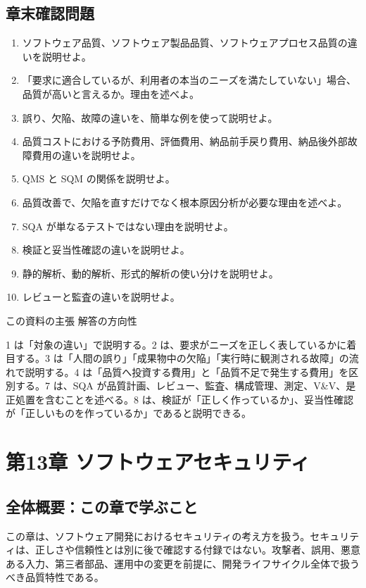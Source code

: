 \documentclass[a4paper,11pt]{ltjsarticle}
\numberwithin{figure}{section}
\numberwithin{table}{section}
\begin{document}
\subsection{章末確認問題}
\begin{enumerate}
  \item ソフトウェア品質、ソフトウェア製品品質、ソフトウェアプロセス品質の違いを説明せよ。
  \item 「要求に適合しているが、利用者の本当のニーズを満たしていない」場合、品質が高いと言えるか。理由を述べよ。
  \item 誤り、欠陥、故障の違いを、簡単な例を使って説明せよ。
  \item 品質コストにおける予防費用、評価費用、納品前手戻り費用、納品後外部故障費用の違いを説明せよ。
  \item QMS と SQM の関係を説明せよ。
  \item 品質改善で、欠陥を直すだけでなく根本原因分析が必要な理由を述べよ。
  \item SQA が単なるテストではない理由を説明せよ。
  \item 検証と妥当性確認の違いを説明せよ。
  \item 静的解析、動的解析、形式的解析の使い分けを説明せよ。
  \item レビューと監査の違いを説明せよ。
\end{enumerate}

\begin{pointbox}{この資料の主張}
解答の方向性\par
1 は「対象の違い」で説明する。2 は、要求がニーズを正しく表しているかに着目する。3 は「人間の誤り」「成果物中の欠陥」「実行時に観測される故障」の流れで説明する。4 は「品質へ投資する費用」と「品質不足で発生する費用」を区別する。7 は、SQA が品質計画、レビュー、監査、構成管理、測定、V\&V、是正処置を含むことを述べる。8 は、検証が「正しく作っているか」、妥当性確認が「正しいものを作っているか」であると説明できる。
\end{pointbox}

\section{第13章 ソフトウェアセキュリティ}

\subsection{全体概要：この章で学ぶこと}
この章は、ソフトウェア開発におけるセキュリティの考え方を扱う。セキュリティは、正しさや信頼性とは別に後で確認する付録ではない。攻撃者、誤用、悪意ある入力、第三者部品、運用中の変更を前提に、開発ライフサイクル全体で扱うべき品質特性である。
\end{document}
